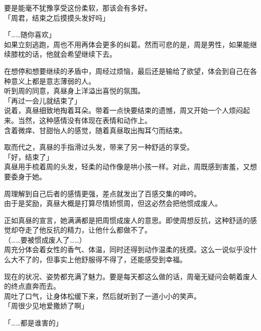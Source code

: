 要是能毫不犹豫享受这份柔软，那该会有多好。\\

「周君，结束之后摸摸头发好吗」

「……随你喜欢」\\

如果立刻逃跑，周也不用再体会更多的纠葛。然而可悲的是，周是男性，如果能继续膝枕的话，他就会希望继续下去。

在想停和想要继续的矛盾中，周经过烦恼，最后还是输给了欲望，体会到自己在各种意义上都是意志薄弱的人。\\

听到周的同意，真昼身上洋溢出喜悦的氛围。\\

「再过一会儿就结束了」\\

说着，真昼细致地掏着耳朵。带着一点快要结束的遗憾，周又开始一个人烦闷起来。当然，这种感情没有体现在表情和动作上。\\

含着微痒、甘甜怡人的感觉，随着真昼取出掏耳勺而结束。

取而代之，真昼的手指滑过头发，带来了另一种舒适的享受。\\

「好，结束了」\\

真昼用手梳着周的头发，轻柔的动作像是哄小孩一样。对此，周既感到害羞，又想要委身于她。

周理解到自己后者的感情更强，差点就发出了百感交集的呻吟。\\

由于是奖励，真昼大概是打算尽情娇惯周，但这必然会把他惯成废人。

正如真昼的宣言，她满满都是把周惯成废人的意思。即使周想反抗，这种舒适的感觉却夺走了他反抗的精力，让他什么都做不了。\\

（……要被惯成废人了……）\\

周充分体会着女性的香气、体温，同时还得到动作温柔的抚摸。这么一说似乎没什么大不了的，但事实上他舒服得不得了，还能感受到幸福。

现在的状况、姿势都充满了魅力。要是每天都这么做的话，周毫无疑问会朝着废人的终点直奔而去。\\

周吐了口气，让身体松缓下来，然后就听到了一道小小的笑声。\\

「周很少见地爱撒娇了啊」

「……都是谁害的」

